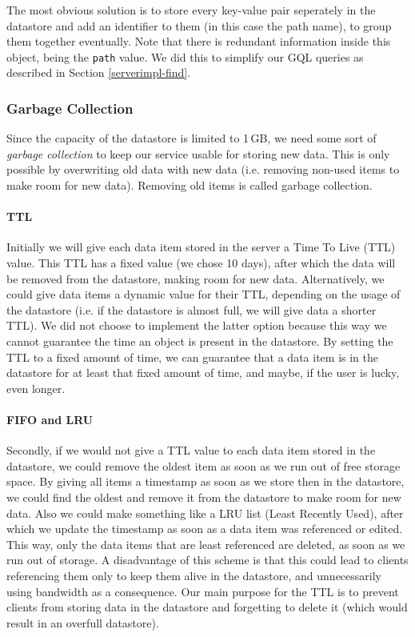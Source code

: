 The most obvious solution is to store every key-value pair seperately in the
datastore and add an identifier to them (in this case the path name), to group
them together eventually. Note that there is redundant information inside this
object, being the \texttt{path} value. We did this to simplify our GQL queries as
described in Section \ref{serverimpl-find}.
 
\subsubsection{Garbage Collection}
Since the capacity of the datastore is limited to 1\,GB, we need some sort of
\emph{garbage collection} to keep our service usable for storing new data. This
is only possible by overwriting old data with new data (i.e. removing non-used
items to make room for new data). Removing old items is called garbage
collection.

\paragraph{TTL}
\label{serverdesign-ttl}
Initially we will give each data item stored in the server a Time To Live (TTL)
value. This TTL has a fixed value (we chose 10 days), after which the data will
be removed from the datastore, making room for new data. Alternatively, we could
give data items a dynamic value for their TTL, depending on the usage of the
datastore (i.e. if the datastore is almost full, we will give data a shorter
TTL). We did not choose to implement the latter option because this way we
cannot guarantee the time an object is present in the datastore. By setting the
TTL to a fixed amount of time, we can guarantee that a data item is in the
datastore for at least that fixed amount of time, and maybe, if the user is
lucky, even longer.

\paragraph{FIFO and LRU}
Secondly, if we would not give a TTL value to each data item stored in the
datastore, we could remove the oldest item as soon as we run out of free storage
space. By giving all items a timestamp as soon as we store then in the datastore,
we could find the oldest and remove it from the datastore to make room for new
data. Also we could make something like a LRU list (Least Recently Used), after
which we update the timestamp as soon as a data item was referenced or edited.
This way, only the data items that are least referenced are deleted, as soon as
we run out of storage. A disadvantage of this scheme is that this could lead to
clients referencing them only to keep them alive in the datastore, and
unnecessarily using bandwidth as a consequence. Our main purpose for the TTL is
to prevent clients from storing data in the datastore and forgetting to delete it
(which would result in an overfull datastore).

